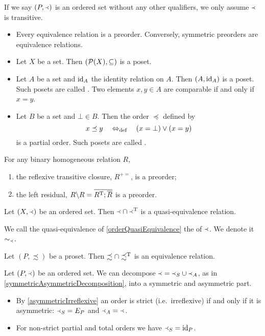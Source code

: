 If we say $\sSet{P,\Yleft}$ is an ordered set without any other qualifiers, we only assume $\Yleft$ is transitive.

\begin{example}
\begin{itemize}
\item Every equivalence relation is a preorder. Conversely, symmetric preorders are equivalence relations.
\item Let $X$ be a set. Then $\sSet{\powerset(X), \subseteq}$ is a poset.
\item Let $A$ be a set and $\operatorname{id}_A$ the identity relation on $A$. Then $\sSet{A,\id_A}$ is a poset. Such posets are called . Two elements $x,y\in A$ are comparable if and only if $x=y$.
\item Let $B$ be a set and $\bot\in B$. Then the order $\preceq$ defined by
\[ x \preceq y \quad\Leftrightarrow_{\text{def}}\quad (x=\bot) \lor (x = y) \]
is a partial order. Such posets are called .
\end{itemize}
\end{example}

\begin{lemma}
For any binary homogeneous relation $R$,
\begin{enumerate}
\item the reflexive transitive closure, $R^{+=}$, is a preorder;
\item the left residual, $R\backslash R = \overline{R^{\mathrm{T}};\overline{R}}$ is a preorder.
\end{enumerate}
\end{lemma}

\begin{lemma} \label{orderQuasiEquivalence}
Let $\sSet{X,\Yleft}$ be an ordered set. Then $\Yleft \cap \Yleft^{\mathrm{T}}$ is a quasi-equivalence relation.
\end{lemma}

\begin{definition}
We call the quasi-equivalence of \ref{orderQuasiEquivalence} the  of $\Yleft$. We denote it $\sim_\Yleft$.
\end{definition}

\begin{lemma} \label{preorderEquivalence}
Let $(P, \precsim)$ be a proset. Then $\precsim \cap \precsim^{\mathrm{T}}$ is an equivalence relation.
\end{lemma}

Let $\sSet{P,\Yleft}$ be an ordered set. We can decompose $\Yleft = \Yleft_S \cup \Yleft_A$, as in \ref{symmetricAsymmetricDecomposition}, into a symmetric and asymmetric part.
\begin{itemize}
\item By \ref{asymmetricIrreflexive} an order is strict (i.e.\ irreflexive) if and only if it is asymmetric: $\Yleft_S = E_P$ and $\Yleft_A = \Yleft$.
\item For non-strict partial and total orders we have $\Yleft_S = \operatorname{id}_P$.
\end{itemize}

